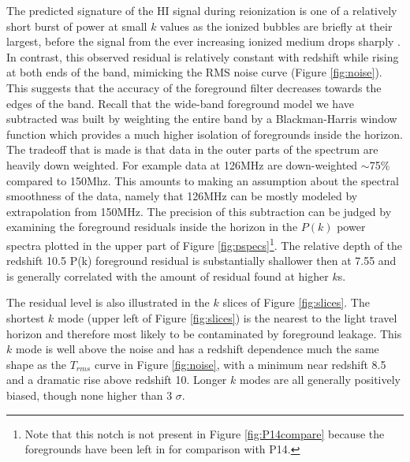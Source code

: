 \documentclass[preprint2]{aastex}
\begin{document}
The predicted signature of the HI signal during reionization is one of a relatively short burst of power at small $k$ values as the ionized bubbles are briefly at their largest, before the signal from the ever increasing ionized medium drops sharply \citep{Pritchard:2008p8123}. In contrast, this observed residual is relatively constant with redshift while rising at both ends of the band, mimicking the RMS noise curve (Figure \ref{fig:noise}).  This suggests that the accuracy of the foreground filter decreases towards the edges of the band.  Recall that the wide-band foreground model we have subtracted was built by weighting the entire band by a Blackman-Harris window function which provides a much higher isolation of foregrounds inside the horizon. The tradeoff that is made is that data in the outer parts of the spectrum are heavily down weighted.  For example data at 126MHz are down-weighted $\sim$75\% compared to 150Mhz.  This amounts to making an assumption about the spectral smoothness of the data, namely that 126MHz can be mostly modeled by extrapolation from 150MHz.  The precision of this subtraction can be judged by examining the foreground residuals inside the horizon in the $P(k)$ power spectra plotted in the upper part of Figure \ref{fig:pspecs}\footnote{Note that this notch is not present in Figure \ref{fig:P14compare} because the foregrounds have been left in for comparison with P14.}.  The relative depth of the redshift 10.5 P(k) foreground residual is substantially shallower then at 7.55 and is generally correlated with the amount of residual found at higher $k$s.


The residual level is also illustrated in the $k$ slices of Figure \ref{fig:slices}.  
 The shortest $k$ mode (upper left of Figure \ref{fig:slices}) is the nearest to the light travel horizon and therefore most likely to be contaminated by foreground leakage. This $k$ mode is well above the noise and has a redshift dependence much the same shape as the $T_{rms}$ curve in Figure \ref{fig:noise}, with a minimum near redshift 8.5 and a dramatic rise above redshift 10. Longer $k$ modes are all generally positively biased, though none higher than 3 $\sigma$.
\end{document}

